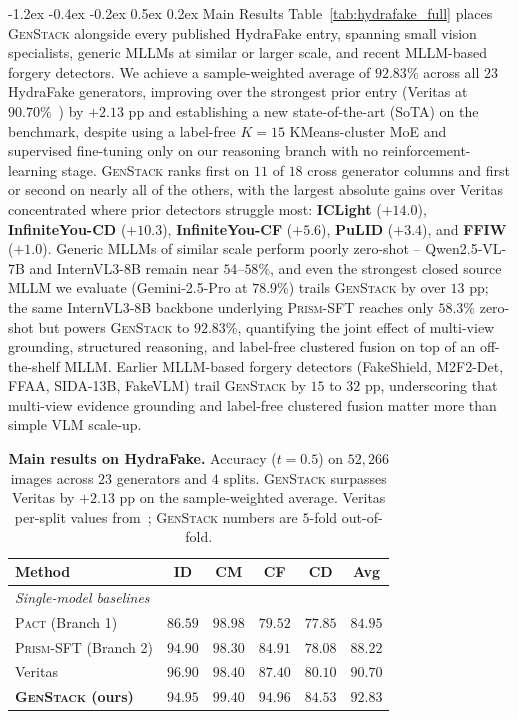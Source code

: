 \documentclass[10pt,twocolumn,letterpaper]{article}
\makeatletter
\renewcommand\subsection{\@startsection{subsection}{2}{\z@}%
  {-1.2ex \@plus -0.4ex \@minus -0.2ex}%
  {0.5ex \@plus 0.2ex}%
  {\normalfont\normalsize\bfseries}}
\newcommand{\vfive}{\textsc{Pact}}
\newcommand{\prism}{\textsc{Prism-SFT}}
\makeatother
\begin{document}
\subsection{Main Results}
\label{sec:main_results}
Table~\ref{tab:hydrafake_full} places \textsc{GenStack} alongside every published HydraFake entry, spanning small vision specialists, generic MLLMs at similar or larger scale, and recent MLLM-based forgery detectors. We achieve a sample-weighted average of $\mathbf{92.83\%}$ across all $23$ HydraFake generators, improving over the strongest prior entry (Veritas at $90.70\%$~\cite{veritas}) by $+2.13$ pp and establishing a new state-of-the-art (SoTA) on the benchmark, despite using a label-free $K{=}15$ KMeans-cluster MoE and supervised fine-tuning only on our reasoning branch with no reinforcement-learning stage. \textsc{GenStack} ranks first on $11$ of $18$ cross generator columns and first or second on nearly all of the others, with the largest absolute gains over Veritas concentrated where prior detectors struggle most: \textbf{ICLight} ($+14.0$), \textbf{InfiniteYou-CD} ($+10.3$), \textbf{InfiniteYou-CF} ($+5.6$), \textbf{PuLID} ($+3.4$), and \textbf{FFIW} ($+1.0$). Generic MLLMs of similar scale perform poorly zero-shot -- Qwen2.5-VL-7B and InternVL3-8B remain near $54$--$58\%$, and even the strongest closed source MLLM we evaluate (Gemini-2.5-Pro at $78.9\%$) trails \textsc{GenStack} by over $13$ pp; the same InternVL3-8B backbone underlying \prism{} reaches only $58.3\%$ zero-shot but powers \textsc{GenStack} to $92.83\%$, quantifying the joint effect of multi-view grounding, structured reasoning, and label-free clustered fusion on top of an off-the-shelf MLLM. Earlier MLLM-based forgery detectors (FakeShield, M2F2-Det, FFAA, SIDA-13B, FakeVLM) trail \textsc{GenStack} by $15$ to $32$ pp, underscoring that multi-view evidence grounding and label-free clustered fusion matter more than simple VLM scale-up.
\begin{table}[t]
\centering
\footnotesize
\setlength{\tabcolsep}{3pt}
\caption{\textbf{Main results on HydraFake.} Accuracy ($t{=}0.5$) on $52{,}266$ images across $23$ generators and $4$ splits. \textsc{GenStack} surpasses Veritas by $+2.13$ pp on the sample-weighted average. Veritas per-split values from~\cite{veritas}; \textsc{GenStack} numbers are $5$-fold out-of-fold.}
\label{tab:main}
\begin{tabular}{l c c c c c}
\toprule
Method & ID & CM & CF & CD & \textbf{Avg} \\
\midrule
\multicolumn{6}{l}{\emph{Single-model baselines}} \\
\vfive{} (Branch 1)        & $86.59$ & $98.98$ & $79.52$ & $77.85$ & $84.95$ \\
\prism{} (Branch 2)        & $94.90$ & $98.30$ & $84.91$ & $78.08$ & $88.22$ \\
Veritas~\cite{veritas}     & $96.90$ & $98.40$ & $87.40$ & $80.10$ & $90.70$ \\
\midrule
\textbf{\textsc{GenStack} (ours)} & $\mathbf{94.95}$ & $\mathbf{99.40}$ & $\mathbf{94.96}$ & $\mathbf{84.53}$ & $\mathbf{92.83}$ \\
\bottomrule
\end{tabular}
\end{table}
\end{document}
